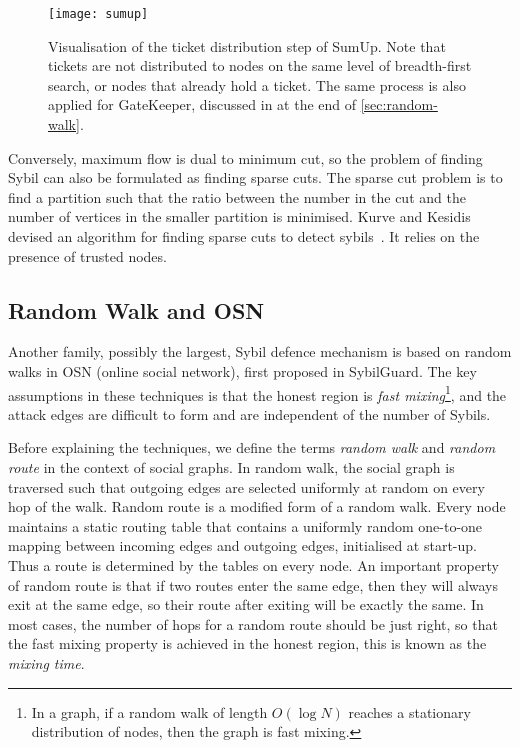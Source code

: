 \begin{figure}
  \centering
  \texttt{[image: sumup]}
  \caption{Visualisation of the ticket distribution step of SumUp. Note that
    tickets are not distributed to nodes on the same level of breadth-first
    search, or nodes that already hold a ticket. The same process is also
    applied for GateKeeper, discussed in at the end of
    \autoref{sec:random-walk}.}
  \label{fig:sumup}
\end{figure}

Conversely, maximum flow is dual to minimum cut, so the problem of finding Sybil
can also be formulated as finding sparse cuts. The sparse cut problem is to find
a partition such that the ratio between the number in the cut and the number of
vertices in the smaller partition is minimised. Kurve and Kesidis devised an
algorithm for finding sparse cuts to detect sybils~\cite{kurve2011sybil}. It
relies on the presence of trusted nodes.

\subsection{Random Walk and OSN}\label{sec:random-walk}
Another family, possibly the largest, Sybil defence mechanism is based on random
walks in OSN (online social network), first proposed in
SybilGuard\cite{yu2006sybilguard}. The key assumptions in these techniques is
that the honest region is \emph{fast mixing}\footnote{In a graph, if a random
  walk of length $O(\log{N})$ reaches a stationary distribution of nodes, then
  the graph is fast mixing.}, and the attack edges are difficult to form and are
independent of the number of Sybils.


Before explaining the techniques, we define the terms \emph{random walk} and
\emph{random route} in the context of social graphs. In random walk, the social
graph is traversed such that outgoing edges are selected uniformly at random on
every hop of the walk. Random route is a modified form of a random walk. Every
node maintains a static routing table that contains a uniformly random
one-to-one mapping between incoming edges and outgoing edges, initialised at
start-up. Thus a route is determined by the tables on every node. An important
property of random route is that if two routes enter the same edge, then they
will always exit at the same edge, so their route after exiting will be exactly
the same. In most cases, the number of hops for a random route should be just
right, so that the fast mixing property is achieved in the honest region, this
is known as the \emph{mixing time}.

